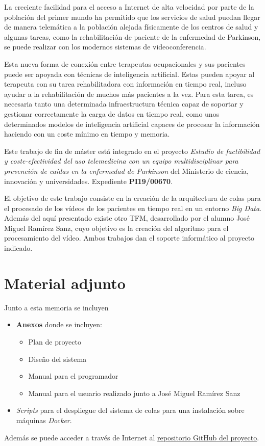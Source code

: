 
La creciente facilidad para el acceso a Internet de alta velocidad por parte de la población del primer mundo ha permitido que los servicios de salud puedan llegar de manera telemática a la población alejada físicamente de los centros de salud y algunas tareas, como la rehabilitación de paciente de la enfermedad de Parkinson, se puede realizar con los modernos sistemas de videoconferencia.

Esta nueva forma de conexión entre terapeutas ocupacionales y sus pacientes puede ser apoyada con técnicas de inteligencia artificial. Estas pueden apoyar al terapeuta con su tarea rehabilitadora con información en tiempo real, incluso ayudar a la rehabilitación de muchos más pacientes a la vez. Para esta tarea, es necesaria tanto una determinada infraestructura técnica capaz de soportar y gestionar correctamente la carga de datos en tiempo real, como unos determinados modelos de inteligencia artificial capaces de procesar la información haciendo con un coste mínimo en tiempo y memoria.

Este trabajo de fin de máster está integrado en el proyecto \textit{Estudio de factibilidad y coste-efectividad del uso telemedicina con un equipo multidisciplinar para prevención de caídas en la enfermedad de Parkinson} del Ministerio de ciencia, innovación y universidades. Expediente \textbf{PI19/00670}. 

El objetivo de este trabajo consiste en la creación de la arquitectura de colas para el procesado de los vídeos de los pacientes en tiempo real en un entorno \textit{Big Data}. Además del aquí presentado existe otro TFM, desarrollado por el alumno José Miguel Ramírez Sanz, cuyo objetivo es la creación del algoritmo para el procesamiento del vídeo. Ambos trabajos dan el soporte informático al proyecto indicado.

\section{Material adjunto}

Junto a esta memoria se incluyen

\begin{itemize}
	\item \textbf{Anexos} donde se incluyen:
	\begin{itemize}
		\item Plan de proyecto
		\item Diseño del sistema
		\item Manual para el programador
		\item Manual para el usuario realizado junto a José Miguel Ramírez Sanz
	\end{itemize}
	\item \textit{Scripts} para el despliegue del sistema de colas para una instalación sobre máquinas \textit{Docker}.
\end{itemize}

Además se puede acceder a través de Internet al \href{https://github.com/jlgarridol/TFM-IF-FIS}{repositorio GitHub del proyecto}.